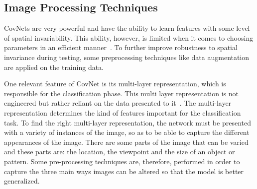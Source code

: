 \documentclass[12pt, a4paper,oneside]{report}
\begin{document}
\subsection{Image Processing Techniques}
CovNets are very powerful and have the ability to learn features with some level of spatial invariability. This ability, however, is limited when it comes to choosing parameters in an efficient manner~\cite{jaderberg2015spatial}. To further improve robustness to spatial invariance during testing, some preprocessing techniques like data augmentation are applied on the training data.

One relevant feature of CovNet is its multi-layer representation, which is responsible for the classification phase. This multi layer representation is not engineered but rather reliant on the data presented to it~\cite{van2017learning}. The multi-layer representation determines the kind of features important for the classification task. To find the right multi-layer representation, the network must be presented with a variety of instances of the image, so as to be able to capture the different appearances of the image. There are some parts of the image that can be varied and these parts are: the location, the viewpoint and the size of an object or pattern. Some pre-processing techniques are, therefore, performed in order to capture the three main ways images can be altered so that the model is better generalized. 
\end{document}
